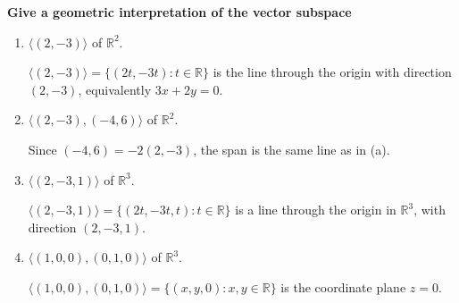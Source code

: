 \providecommand{\rank}{\operatorname{r}}
\providecommand{\RR}{\mathbb R}
\providecommand{\CC}{\mathbb C}
\providecommand{\KK}{\mathbb K}

\setcounter{enumi}{71}
\item {\bfseries\boldmath
Give a geometric interpretation of the vector subspace
}

\begin{enumerate}[label=\alph*)]

\item $\langle(2,-3)\rangle$ of $\RR^2$.

\begin{answer}
$\langle(2,-3)\rangle=\{(2t,-3t):t\in\RR\}$ is the line through the
origin with direction $(2,-3)$, equivalently $3x+2y=0$.
\end{answer}

\item $\langle(2,-3),(-4,6)\rangle$ of $\RR^2$.

\begin{answer}
Since $(-4,6)=-2(2,-3)$, the span is the same line as in (a).
\end{answer}

\item $\langle(2,-3,1)\rangle$ of $\RR^3$.

\begin{answer}
$\langle(2,-3,1)\rangle=\{(2t,-3t,t):t\in\RR\}$ is a line through
the origin in $\RR^3$, with direction $(2,-3,1)$.
\end{answer}

\item $\langle(1,0,0),(0,1,0)\rangle$ of $\RR^3$.

\begin{answer}
$\langle(1,0,0),(0,1,0)\rangle=\{(x,y,0):x,y\in\RR\}$ is the
coordinate plane $z=0$.
\end{answer}
\end{enumerate}
